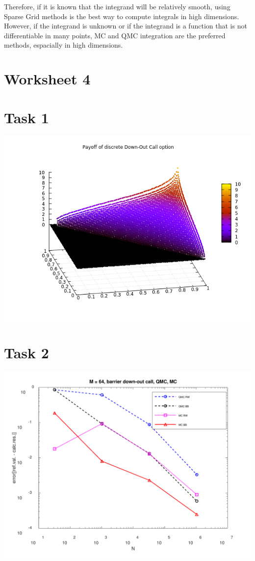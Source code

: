 \documentclass[10pt,a4paper]{article}
\begin{document}
Therefore, if it is known that the integrand will be relatively smooth, using Sparse Grid methods is the best way to compute integrals in high dimensions. However, if the integrand is unknown or if the integrand is a function that is not differentiable in many points, MC and QMC integration are the preferred methods, espacially in high dimensions.

\section*{Worksheet 4}

\section*{Task 1}

\begin{center}
	\includegraphics[scale=0.7]{images/payoff_down_out_call.png}
\end{center}

\section*{Task 2}


\begin{center}
	\includegraphics[scale=0.25]{images/task2_error.png}
\end{center}
\end{document}
